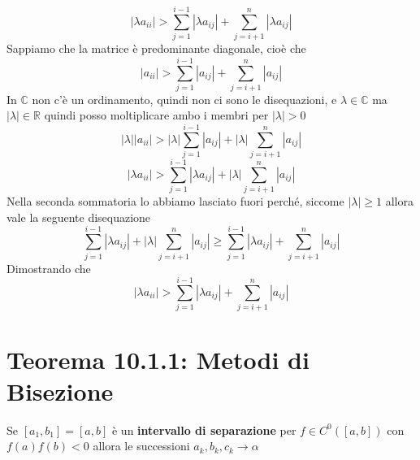 \documentclass[10pt]{book}
\begin{document}
$$|\lambda a_{ii}| > \sum_{j=1}^{i-1} |\lambda a_{ij}| + \sum_{j=i+1}^{n} |\lambda a_{ij}|$$
Sappiamo che la matrice è predominante diagonale, cioè che
$$|a_{ii}| > \sum_{j=1}^{i-1} |a_{ij}| + \sum_{j=i+1}^{n} |a_{ij}|$$
In $\mathbb{C}$ non c'è un ordinamento, quindi non ci sono le disequazioni, e $\lambda \in \mathbb{C}$ ma $|\lambda| \in \mathbb{R}$ quindi posso moltiplicare ambo i membri per $|\lambda| > 0$
$$|\lambda||a_{ii}| > |\lambda|\sum_{j=1}^{i-1} |a_{ij}| + |\lambda|\sum_{j=i+1}^{n} |a_{ij}|$$
$$|\lambda a_{ii}| > \sum_{j=1}^{i-1} |\lambda a_{ij}| + |\lambda|\sum_{j=i+1}^{n} |a_{ij}|$$
Nella seconda sommatoria lo abbiamo lasciato fuori perché, siccome $|\lambda| \geq 1$ allora vale la seguente disequazione
$$\sum_{j=1}^{i-1} |\lambda a_{ij}| + |\lambda|\sum_{j=i+1}^{n} |a_{ij}| \geq \sum_{j=1}^{i-1} |\lambda a_{ij}| + \sum_{j=i+1}^{n} |a_{ij}|$$
Dimostrando che 
$$|\lambda a_{ii}| > \sum_{j=1}^{i-1} |\lambda a_{ij}| + \sum_{j=i+1}^{n} |a_{ij}|$$

\section{Teorema 10.1.1: Metodi di Bisezione} Se $[a_1, b_1] = [a, b]$ è un \textbf{intervallo di separazione} per $f \in C^0([a, b])$ con $f(a)f(b) < 0$ allora le successioni $a_k, b_k, c_k \longrightarrow \alpha$
\end{document}
